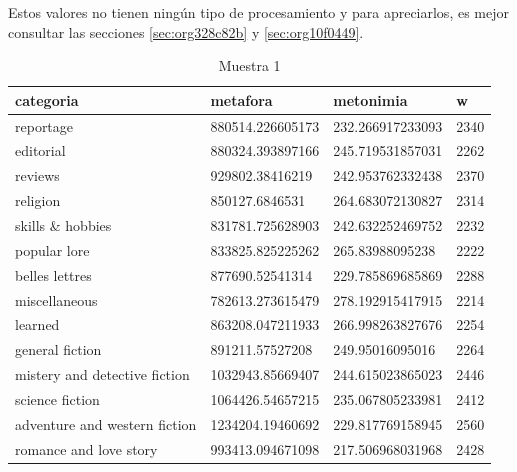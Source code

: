 \documentclass[12pt,letterpaper,twoside]{article}
\begin{document}
Estos valores no tienen ningún tipo de procesamiento y para apreciarlos, es mejor
consultar las secciones \ref{sec:org328c82b} y \ref{sec:org10f0449}.
\begin{center}
    \begin{longtable}{| p{} | p{} | p{}|p{}|}
    \caption{Muestra 1}
    \hline
        categoria & metafora & metonimia & w \\ \hline
        reportage & 880514.226605173 & 232.266917233093 & 2340 \\ \hline
        editorial & 880324.393897166 & 245.719531857031 & 2262 \\ \hline
        reviews & 929802.38416219 & 242.953762332438 & 2370 \\ \hline
        religion & 850127.6846531 & 264.683072130827 & 2314 \\ \hline
        skills \& hobbies & 831781.725628903 & 242.632252469752 & 2232 \\ \hline
        popular lore & 833825.825225262 & 265.83988095238 & 2222 \\ \hline
        belles lettres & 877690.52541314 & 229.785869685869 & 2288 \\ \hline
        miscellaneous & 782613.273615479 & 278.192915417915 & 2214 \\ \hline
        learned & 863208.047211933 & 266.998263827676 & 2254 \\ \hline
        general fiction & 891211.57527208 & 249.95016095016 & 2264 \\ \hline
        mistery and detective fiction & 1032943.85669407 & 244.615023865023 & 2446 \\ \hline
        science fiction & 1064426.54657215 & 235.067805233981 & 2412 \\ \hline
        adventure and western fiction & 1234204.19460692 & 229.817769158945 & 2560 \\ \hline
        romance and love story & 993413.094671098 & 217.506968031968 & 2428 \\ \hline
\end{longtable}
\label{muestra1}
\end{center}
\end{document}
